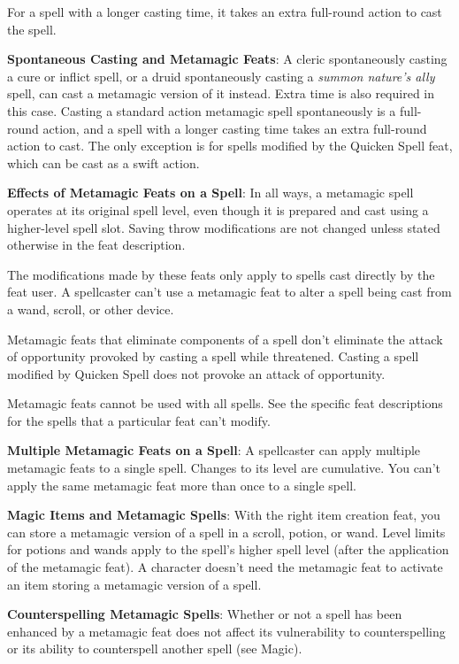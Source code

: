 For a spell with a longer casting time, it takes an extra full-round action to cast the spell.
				
\textbf{Spontaneous Casting and Metamagic Feats}: A cleric spontaneously casting a cure or inflict spell, or a druid spontaneously casting a \textit{summon nature's ally }spell, can cast a metamagic version of it instead. Extra time is also required in this case. Casting a standard action metamagic spell spontaneously is a full-round action, and a spell with a longer casting time takes an extra full-round action to cast. The only exception is for spells modified by the Quicken Spell feat, which can be cast as a swift action.
				
\textbf{Effects of Metamagic Feats on a Spell}: In all ways, a metamagic spell operates at its original spell level, even though it is prepared and cast using a higher-level spell slot. Saving throw modifications are not changed unless stated otherwise in the feat description.
				
The modifications made by these feats only apply to spells cast directly by the feat user. A spellcaster can't use a metamagic feat to alter a spell being cast from a wand, scroll, or other device.
				
Metamagic feats that eliminate components of a spell don't eliminate the attack of opportunity provoked by casting a spell while threatened. Casting a spell modified by Quicken Spell does not provoke an attack of opportunity.
				
Metamagic feats cannot be used with all spells. See the specific feat descriptions for the spells that a particular feat can't modify.
				
\textbf{Multiple Metamagic Feats on a Spell}: A spellcaster can apply multiple metamagic feats to a single spell. Changes to its level are cumulative. You can't apply the same metamagic feat more than once to a single spell.
				
\textbf{Magic Items and Metamagic Spells}: With the right item creation feat, you can store a metamagic version of a spell in a scroll, potion, or wand. Level limits for potions and wands apply to the spell's higher spell level (after the application of the metamagic feat). A character doesn't need the metamagic feat to activate an item storing a metamagic version of a spell.
				
\textbf{Counterspelling Metamagic Spells}: Whether or not a spell has been enhanced by a metamagic feat does not affect its vulnerability to counterspelling or its ability to counterspell another spell (see Magic).
				
